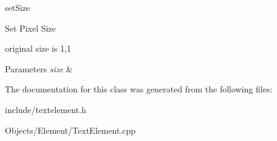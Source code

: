 set\+Size 

Set Pixel Size
\begin{DoxyItemize}
\item original size is 1,1 
\begin{DoxyParams}{Parameters}
{\em size} & \\
\hline
\end{DoxyParams}

\end{DoxyItemize}

The documentation for this class was generated from the following files\+:\begin{DoxyCompactItemize}
\item 
include/textelement.\+h\item 
Objects/\+Element/Text\+Element.\+cpp\end{DoxyCompactItemize}
